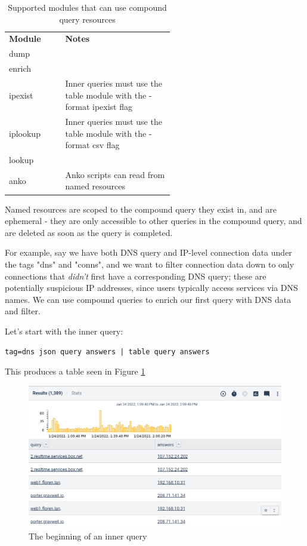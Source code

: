 \begin{table}[H]
\begin{tabular}{ | p{0.15\linewidth} | p{0.4\linewidth} | }
\hline
\textbf{Module} & \textbf{Notes}\\
dump & \\
\hline
enrich & \\
\hline
ipexist & Inner queries must use the table module with the -format ipexist flag \\
\hline
iplookup & Inner queries must use the table module with the -format csv flag \\
\hline
lookup & \\
\hline
anko & Anko scripts can read from named resources \\
\hline
\end{tabular}
	\caption{Supported modules that can use compound query resources}
\label{table:supported-modules}
\end{table}

Named resources are scoped to the compound query they exist in, and are
ephemeral - they are only accessible to other queries in the compound query,
and are deleted as soon as the query is completed.

For example, say we have both DNS query and IP-level connection data under the
tags "dns" and "conns", and we want to filter connection data down to only
connections that \emph{didn't} first have a corresponding DNS query; these are potentially suspicious IP addresses, since users typically access services via DNS names. We can use
compound queries to enrich our first query with DNS data and filter.

Let's start with the inner query:

\begin{verbatim}
tag=dns json query answers | table query answers
\end{verbatim}

This produces a table seen in Figure \ref{fig:compound-table1}

\begin{figure}
	\includegraphics[width=0.8\linewidth]{images/compound-table1.png}
	\caption{The beginning of an inner query}
	\label{fig:compound-table1}
\end{figure}

